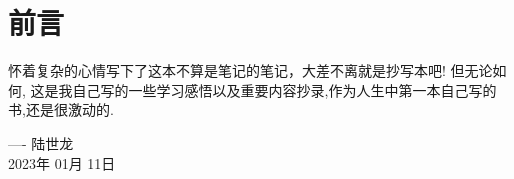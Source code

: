 \thispagestyle{empty}
\chapter*{前言}
怀着复杂的心情写下了这本不算是笔记的笔记，大差不离就是抄写本吧! 但无论如何, 这是我自己写的一些学习感悟以及重要内容抄录,作为人生中第一本自己写的书,还是很激动的.


\hfill ---- 陆世龙\\ 
\phantom{\rule{.8\linewidth+.1em}{0pt}}  2023年 01月 11日
\begin{center}
    \vfill
    \thepage
\end{center}
\let\cleardoublepage\clearpage